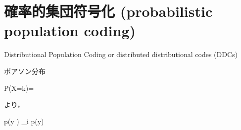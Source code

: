 \section{確率的集団符号化 (probabilistic population coding)}

Distributional Population Coding or distributed distributional codes (DDCs)

ポアソン分布


P(X=k)={}


より，


p(y \mid {}) \propto \prod_{i}  p(y)
